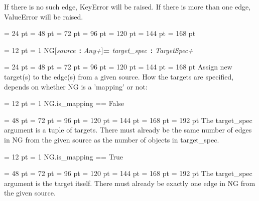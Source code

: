 {{{{{{          If there is no such edge, KeyError will be raised.
          If there is more than one edge, ValueError will be raised.\par}
\par}
\par}
\par}
\par}
{\par \noindent  \leftskip = 24 pt  \leftmargini = 48 pt  \leftmarginii = 72 pt  \leftmarginiii = 96 pt  \leftmarginiv = 120 pt  \leftmarginv = 144 pt  \leftmarginvi = 168 pt {\par \noindent
\par}
\par}
{\par \pagebreak[3.300000] \noindent \hangindent = 12 pt \hangafter = 1 
NG{[}{\em source\/}~{\bf :}  {\em Any+\/}]{\bf {\large {\bf  = \/}}\/}{\em target{\_}spec\/}~{\bf :}  {\em TargetSpec+\/}\par}
{\par \noindent  \leftskip = 24 pt  \leftmargini = 48 pt  \leftmarginii = 72 pt  \leftmarginiii = 96 pt  \leftmarginiv = 120 pt  \leftmarginv = 144 pt  \leftmarginvi = 168 pt  Assign new target(s) to the edge(s) from a given source. How the
targets are specified, depends on whether NG is a 'mapping' or not:{\par \noindent
{\par \pagebreak[3.200000] \noindent \hangindent = 12 pt \hangafter = 1 
 NG.is{\_}mapping == False\par}
{\par \noindent  \leftskip = 48 pt  \leftmargini = 72 pt  \leftmarginii = 96 pt  \leftmarginiii = 120 pt  \leftmarginiv = 144 pt  \leftmarginv = 168 pt  \leftmarginvi = 192 pt  The target{\_}spec argument is a tuple of targets.
    There must already be the same number of edges in NG from the given
    source as the number of objects in target{\_}spec.\par}
{\par \pagebreak[3.200000] \noindent \hangindent = 12 pt \hangafter = 1 
 NG.is{\_}mapping == True\par}
{\par \noindent  \leftskip = 48 pt  \leftmargini = 72 pt  \leftmarginii = 96 pt  \leftmarginiii = 120 pt  \leftmarginiv = 144 pt  \leftmarginv = 168 pt  \leftmarginvi = 192 pt  The target{\_}spec argument is the target itself.
    There must already be exactly one edge in NG from the given source.\par}
\par}
}}
